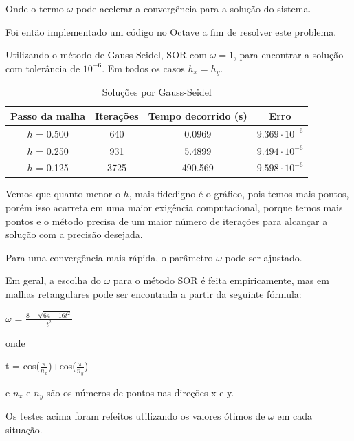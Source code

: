 \documentclass[
12pt,				%
oneside,			%
a4paper,			%
english,			%
french,				%
spanish,			%
brazil				%
]{abntex2}
\begin{document}
Onde o termo $\omega$ pode acelerar a convergência para a solução do sistema.

Foi então implementado um código no Octave a fim de resolver este problema.

Utilizando o  método de Gauss-Seidel, SOR com $\omega = 1$, para encontrar a solução com tolerância de $10^{-6}$.
Em todos os casos $h_{x} = h_{y}$.

\begin{table}[H]
	\centering
	\caption{Soluções por Gauss-Seidel}
	\label{tab:validacao_seidel}
	\begin{tabular}{cccc}
		\toprule
		{\textbf{Passo da malha} }& {\textbf{Iterações}}& {\textbf{Tempo decorrido (s)}} & {\textbf{Erro}}   \\ \midrule
		{$h$ = 0.500} & { 640 } & { 0.0969 } & { $9.369\cdot10^{-6}$ }    \\
		{$h$ = 0.250} & { 931 } & { 5.4899 } & { $9.494\cdot10^{-6}$ }   \\
		{$h$ = 0.125} & { 3725 } & { 490.569 } & { $9.598\cdot10^{-6}$ }   \\
		\hline
		
	\end{tabular}
\end{table}

Vemos que quanto menor o $h$, mais fidedigno é o gráfico, pois temos mais pontos, porém isso acarreta em uma maior exigência computacional, porque temos mais pontos e o método precisa de um maior número de iterações para alcançar a solução com a precisão desejada.

Para uma convergência mais rápida, o parâmetro $\omega$ pode ser ajustado.

Em geral, a escolha do $\omega$ para o método SOR é feita empiricamente, mas em malhas retangulares pode ser encontrada a partir da seguinte fórmula:

\begin{center}$\omega$ =  $\frac{8-\sqrt{64-16t^2}}{t^2}$\end{center}

onde

\begin{center}t = cos($\frac{\pi}{n_x}$)+cos($\frac{\pi}{n_y}$)\end{center}

e $n_x$ e $n_y$ são os números de pontos nas direções x e y.

Os testes acima foram refeitos utilizando os valores ótimos de $\omega$ em cada situação.
\end{document}
